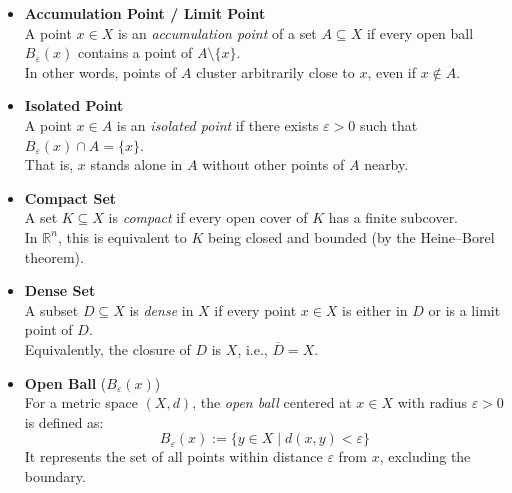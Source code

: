 \begin{itemize}[label=$-$]
	\item \textbf{Accumulation Point / Limit Point}\\
	      A point \( x \in X \) is an \emph{accumulation point} of a set \( A \subseteq X \) if every open ball \( B_\varepsilon(x) \) contains a point of \( A \setminus \{x\} \). \\
	      In other words, points of \( A \) cluster arbitrarily close to \( x \), even if \( x \notin A \).

	\item \textbf{Isolated Point} \\
	      A point \( x \in A \) is an \emph{isolated point} if there exists \( \varepsilon > 0 \) such that \( B_\varepsilon(x) \cap A = \{x\} \). \\
	      That is, \( x \) stands alone in \( A \) without other points of \( A \) nearby.

	\item \textbf{Compact Set} \\
	      A set \( K \subseteq X \) is \emph{compact} if every open cover of \( K \) has a finite subcover. \\
	      In \(\mathbb{R}^n\), this is equivalent to \( K \) being closed and bounded (by the Heine–Borel theorem).

	\item \textbf{Dense Set} \\
	      A subset \( D \subseteq X \) is \emph{dense} in \( X \) if every point \( x \in X \) is either in \( D \) or is a limit point of \( D \). \\
	      Equivalently, the closure of \( D \) is \( X \), i.e., \( \overline{D} = X \).

	\item \textbf{Open Ball} (\( B_\varepsilon(x) \)) \\
	      For a metric space \( (X, d) \), the \emph{open ball} centered at \( x \in X \) with radius \( \varepsilon > 0 \) is defined as: \\
	      \[
		      B_\varepsilon(x) := \{ y \in X \mid d(x, y) < \varepsilon \}
	      \]
	      It represents the set of all points within distance \( \varepsilon \) from \( x \), excluding the boundary.
\end{itemize}

\newpage